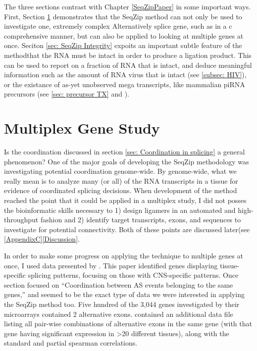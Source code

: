   The three sections contrast with Chapter \ref{SeqZipPaper} in some important ways. First, Section \ref{sec: Multiplex Gene Study} demonstrates that the SeqZip method can not only be used to investigate one, extremely complex Alternatively splice gene, such as \dscam{} in a c comprehensive manner, but can also be applied to looking at multiple genes at once. Seciton \ref{sec: SeqZip Integrity} expoits an important subtle feature of the method\textemdash that the RNA must be intact in order to produce a ligation product. This can be used to report on a fraction of RNA that is intact, and deduce meaningful information such as the amount of RNA virus that is intact (see \ref{subsec: HIV}), or the existance of as-yet unobserved mega transcripts, like mammalian piRNA precursors (see \ref{sec: precursor TX} and \citep{Li2013h,Li2013}).

\section{Multiplex Gene Study}\label{sec: Multiplex Gene Study}

  Is the coordination discussed in section \ref{sec: Coordination in splicing} a general phenomenon? One of the major goals of developing the SeqZip methodology was investigating potential coordination genome-wide. By genome-wide, what we really mean is to analyze many (or all) of the RNA transcripts in a tissue for evidence of coordinated splicing decisions. When development of the method reached the point that it could be applied in a multiplex study, I did not posses the bioinformatic skills necessary to 1) design ligamers in an automated and high-throughput fashion and 2) identify target transcripts, exons, and sequences to investigate for potential connectivity. Both of these points are discussed later(see \ref{AppendixC}\ref{Discussion}. 

  In order to make some progress on applying the technique to multiple genes at once, I used data presented by \citet{Fagnani2007}. This paper identified genes displaying tissue-specific splicing patterns, focusing on those with CNS-specific patterns. Once section focused on ``Coordination between AS events belonging to the same genes,'' and seemed to be the exact type of data we were interested in applying the SeqZip method too. Five hundred of the 3,044 genes investigated by their microarrays contained 2 alternative exons. \citet{Fagnani2007} contained an additional data file listing all pair-wise combinations of alternative exons in the same gene (with that gene having significant expression in >20 different tissues), along with the standard and partial spearman correlations. 

